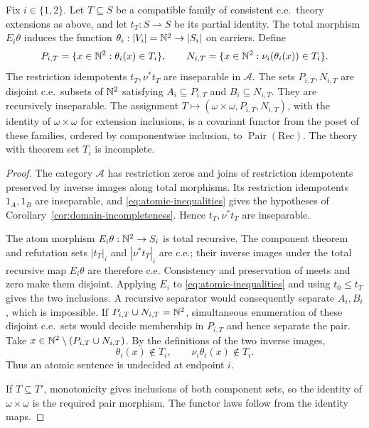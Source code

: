 \begin{theorem}\label{thm:cosheaf-observation}
Fix $i\in\{1,2\}$. Let $T\subseteq S$ be a compatible family of
consistent c.e.\ theory extensions as above, and let
$t_T:S\rightharpoonup S$ be its partial identity. The total morphism $E_i\theta$ induces the function
$\theta_i:|V_i|=\mathbb N^2\to |S_i|$ on carriers. Define
\[
 P_{i,T}=\{x\in\mathbb N^2:\theta_i(x)\in T_i\},\qquad
 N_{i,T}=\{x\in\mathbb N^2:\nu_i(\theta_i(x))\in T_i\}.
\]
The restriction idempotents $t_T,\nu^*t_T$ are inseparable in $\mathcal A$.
The sets $P_{i,T},N_{i,T}$ are disjoint c.e.\ subsets of $\mathbb N^2$ satisfying
$A_i\subseteq P_{i,T}$ and $B_i\subseteq N_{i,T}$.
They are recursively inseparable. The assignment
$T\mapsto(\omega\times\omega,P_{i,T},N_{i,T})$,
with the identity of $\omega\times\omega$ for extension inclusions, is a
covariant functor from the poset of these families, ordered by componentwise
inclusion, to $\operatorname{Pair}(\mathrm{Rec})$.
The theory with theorem set $T_i$ is incomplete.
\end{theorem}
\begin{proof}
The category $\mathcal A$ has restriction zeros and joins of restriction idempotents
preserved by inverse images along total morphisms. Its restriction idempotents $1_A,1_B$ are inseparable,
and \eqref{eq:atomic-inequalities} gives the hypotheses of
Corollary~\ref{cor:domain-incompleteness}. Hence $t_T,\nu^*t_T$ are
inseparable.

The atom morphism $E_i\theta:\mathbb N^2\to S_i$ is total recursive.
The component theorem and refutation sets $|t_T|_i$ and $|\nu^*t_T|_i$
are c.e.; their inverse images under the total recursive map
$E_i\theta$ are therefore c.e. Consistency and preservation of meets and
zero make them disjoint. Applying $E_i$ to
\eqref{eq:atomic-inequalities} and using $t_0\le t_T$ gives
the two inclusions. A recursive separator would consequently
separate $A_i,B_i$, which is impossible.
If $P_{i,T}\cup N_{i,T}=\mathbb N^2$, simultaneous enumeration of these
disjoint c.e.\ sets would decide membership in $P_{i,T}$ and hence
separate the pair. Take $x\in\mathbb N^2\setminus(P_{i,T}\cup N_{i,T})$.
By the definitions of the two inverse images,
\[
  \theta_i(x)\notin T_i,\qquad \nu_i\theta_i(x)\notin T_i .
\]
Thus an atomic sentence is undecided at endpoint $i$.

If $T\subseteq T'$, monotonicity gives inclusions of both component
sets, so the identity of $\omega\times\omega$ is the required pair morphism.
The functor laws follow from the identity maps.
\end{proof}

